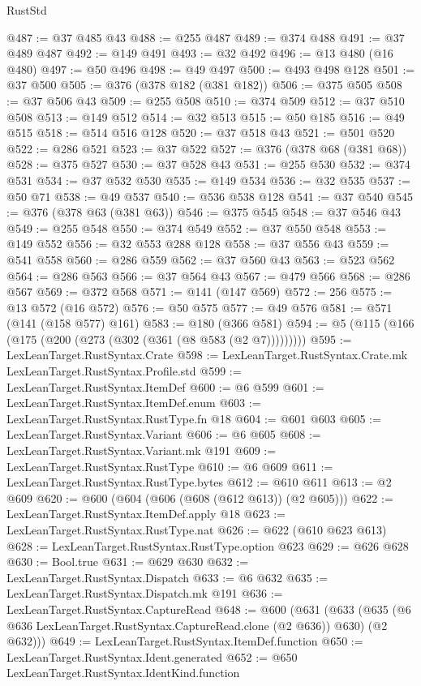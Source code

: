 \begin{lexlean}{RustStd}
\begin{coremodule}
@487 := @37 @485 @43
@488 := @255 @487
@489 := @374 @488
@491 := @37 @489 @487
@492 := @149 @491
@493 := @32 @492
@496 := @13 @480 (@16 @480)
@497 := @50 @496
@498 := @49 @497
@500 := @493 @498 @128
@501 := @37 @500
@505 := @376 (@378 @182 (@381 @182))
@506 := @375 @505
@508 := @37 @506 @43
@509 := @255 @508
@510 := @374 @509
@512 := @37 @510 @508
@513 := @149 @512
@514 := @32 @513
@515 := @50 @185
@516 := @49 @515
@518 := @514 @516 @128
@520 := @37 @518 @43
@521 := @501 @520
@522 := @286 @521
@523 := @37 @522
@527 := @376 (@378 @68 (@381 @68))
@528 := @375 @527
@530 := @37 @528 @43
@531 := @255 @530
@532 := @374 @531
@534 := @37 @532 @530
@535 := @149 @534
@536 := @32 @535
@537 := @50 @71
@538 := @49 @537
@540 := @536 @538 @128
@541 := @37 @540
@545 := @376 (@378 @63 (@381 @63))
@546 := @375 @545
@548 := @37 @546 @43
@549 := @255 @548
@550 := @374 @549
@552 := @37 @550 @548
@553 := @149 @552
@556 := @32 @553 @288 @128
@558 := @37 @556 @43
@559 := @541 @558
@560 := @286 @559
@562 := @37 @560 @43
@563 := @523 @562
@564 := @286 @563
@566 := @37 @564 @43
@567 := @479 @566
@568 := @286 @567
@569 := @372 @568
@571 := @141 (@147 @569)
@572 := 256
@575 := @13 @572 (@16 @572)
@576 := @50 @575
@577 := @49 @576
@581 := @571 (@141 (@158 @577) @161)
@583 := @180 (@366 @581)
@594 := @5 (@115 (@166 (@175 (@200 (@273 (@302 (@361 (@8 @583 (@2 @7)))))))))
@595 := LexLeanTarget.RustSyntax.Crate
@598 := LexLeanTarget.RustSyntax.Crate.mk LexLeanTarget.RustSyntax.Profile.std
@599 := LexLeanTarget.RustSyntax.ItemDef
@600 := @6 @599
@601 := LexLeanTarget.RustSyntax.ItemDef.enum
@603 := LexLeanTarget.RustSyntax.RustType.fn @18
@604 := @601 @603
@605 := LexLeanTarget.RustSyntax.Variant
@606 := @6 @605
@608 := LexLeanTarget.RustSyntax.Variant.mk @191
@609 := LexLeanTarget.RustSyntax.RustType
@610 := @6 @609
@611 := LexLeanTarget.RustSyntax.RustType.bytes
@612 := @610 @611
@613 := @2 @609
@620 := @600 (@604 (@606 (@608 (@612 @613)) (@2 @605)))
@622 := LexLeanTarget.RustSyntax.ItemDef.apply @18
@623 := LexLeanTarget.RustSyntax.RustType.nat
@626 := @622 (@610 @623 @613)
@628 := LexLeanTarget.RustSyntax.RustType.option @623
@629 := @626 @628
@630 := Bool.true
@631 := @629 @630
@632 := LexLeanTarget.RustSyntax.Dispatch
@633 := @6 @632
@635 := LexLeanTarget.RustSyntax.Dispatch.mk @191
@636 := LexLeanTarget.RustSyntax.CaptureRead
@648 := @600
    (@631
      (@633 (@635 (@6 @636 LexLeanTarget.RustSyntax.CaptureRead.clone (@2 @636)) @630) (@2 @632)))
@649 := LexLeanTarget.RustSyntax.ItemDef.function
@650 := LexLeanTarget.RustSyntax.Ident.generated
@652 := @650 LexLeanTarget.RustSyntax.IdentKind.function

\end{coremodule}
\end{lexlean}

